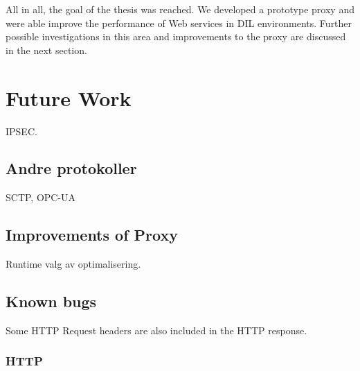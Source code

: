 All in all, the goal of the thesis was reached. We developed a prototype proxy
and were able improve the performance of Web services in DIL environments.
Further possible investigations in this area and improvements to the proxy are
discussed in the next section.


\section{Future Work}
IPSEC.

\subsection{Andre protokoller}
SCTP, OPC-UA

\subsection{Improvements of Proxy}

Runtime valg av optimalisering.




\subsection{Known bugs}

Some HTTP Request headers are also included in the HTTP response.

\subsubsection{HTTP}
